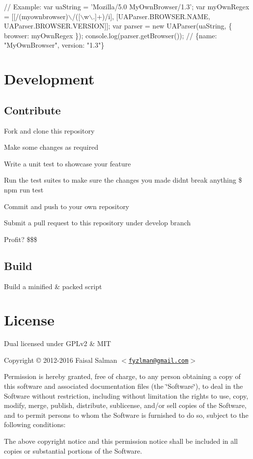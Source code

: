\begin{DoxyCode}
// Example:
var uaString = 'Mozilla/5.0 MyOwnBrowser/1.3';
var myOwnRegex = [[/(myownbrowser)\(\backslash\)/([\(\backslash\)w\(\backslash\).]+)/i], [UAParser.BROWSER.NAME, UAParser.BROWSER.VERSION]];
var parser = new UAParser(uaString, \{ browser: myOwnRegex \});
console.log(parser.getBrowser());   // \{name: "MyOwnBrowser", version: "1.3"\}
\end{DoxyCode}


\section*{Development}

\subsection*{Contribute}


\begin{DoxyItemize}
\item Fork and clone this repository
\item Make some changes as required
\item Write a unit test to showcase your feature
\item Run the test suites to make sure the changes you made didn\textquotesingle{}t break anything {\ttfamily \$ npm run test}
\item Commit and push to your own repository
\item Submit a pull request to this repository under {\ttfamily develop} branch
\item Profit? \$\$\$
\end{DoxyItemize}

\subsection*{Build}

Build a minified \& packed script




\section*{License}

Dual licensed under G\+P\+Lv2 \& M\+IT

Copyright © 2012-\/2016 Faisal Salman $<$\href{mailto:fyzlman@gmail.com}{\tt fyzlman@gmail.\+com}$>$

Permission is hereby granted, free of charge, to any person obtaining a copy of this software and associated documentation files (the \char`\"{}\+Software\char`\"{}), to deal in the Software without restriction, including without limitation the rights to use, copy, modify, merge, publish, distribute, sublicense, and/or sell copies of the Software, and to permit persons to whom the Software is furnished to do so, subject to the following conditions\+:

The above copyright notice and this permission notice shall be included in all copies or substantial portions of the Software. 